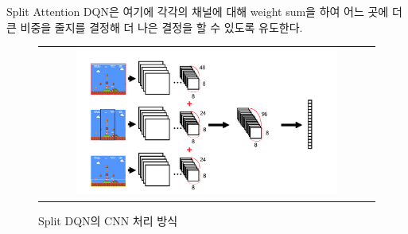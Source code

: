 Split Attention DQN은 여기에 각각의 채널에 대해 weight sum을 하여 어느 곳에 더 큰 비중을 줄지를 결정해 더 나은 결정을 할 수 있도록 유도한다. 


\begin{figure}[]
\begin{center}
\begin{tabular}{c}
     \includegraphics[width=0.8\textwidth]{FIG/split_dqn.png} \\
\end{tabular}
\caption{
	Split DQN의 CNN 처리 방식
}
\label{fig:split_dqn}
\end{center}
\end{figure}

